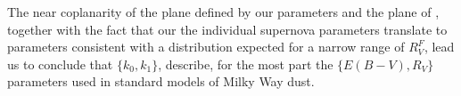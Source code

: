 \documentclass{aastex61}   	%
\begin{document}
The near coplanarity of the plane defined by our parameters and the plane of  , together with the fact that our the individual supernova
parameters translate to   parameters consistent with a distribution expected for a narrow range of $R^F_V$, lead us to conclude that 
$\{k_0, k_1\}$, describe, for the most part the $\{ E(B-V), R_V\}$ parameters used
in standard models of Milky Way dust.

%
%
%
%
%


%
%
%

%
\end{document}
